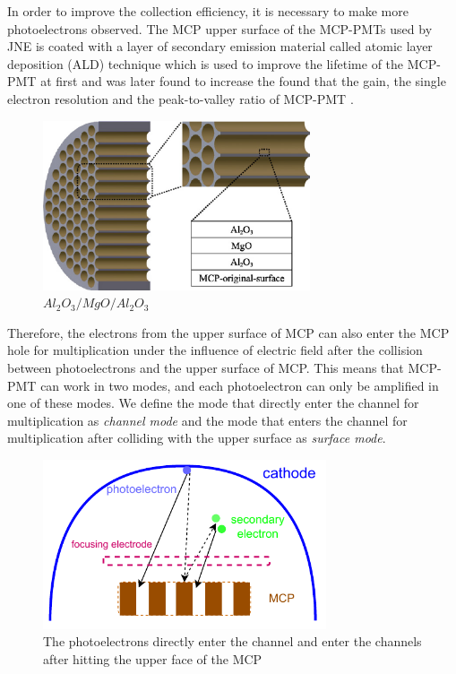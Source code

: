 \documentclass{article}
\begin{document}
In order to improve the collection efficiency, it is necessary to make more photoelectrons observed.
The MCP upper surface of the MCP-PMTs used by JNE is coated with a layer of secondary emission material\cite{zzj2021Al}
called atomic layer deposition (ALD) technique which is used to improve the lifetime of the MCP-PMT
at first and  was later found to increase the found that the gain, the single electron resolution
and the peak-to-valley ratio of MCP-PMT \cite{2021Effects}.
\begin{figure}[ht]
    \centering
    \includegraphics[height=5cm]{pic/ALD.pdf}
    \caption{$Al_2O_3/MgO/Al_2O_3$}\label{fig:A LD}
\end{figure}

Therefore, the electrons from the upper surface of MCP can also enter the MCP hole for multiplication
under the influence of electric field after the collision between photoelectrons and the upper surface of MCP.\@
This means that MCP-PMT can work in two modes, and each photoelectron can only be amplified in one of these modes.
We define the mode that directly enter the channel for multiplication as \textit{channel mode} and
the mode that enters the channel for multiplication after colliding with the upper surface as \textit{surface mode}.
\begin{figure}[ht]
    \centering
    \includegraphics[height=5cm]{pic/MCPelectron.pdf}
    \caption{The photoelectrons directly enter the channel and enter the channels after hitting the upper face of the MCP}\label{fig:MCP}
\end{figure}
\end{document}
